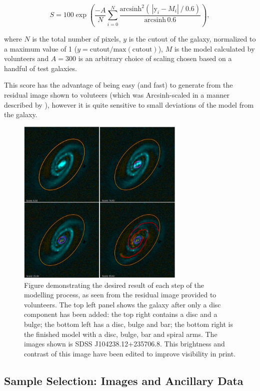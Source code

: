 \documentclass[../main.tex]{subfiles}
\begin{document}
\begin{equation}
  \label{eqn:gal_score}
    S = 100 \exp\left(\frac{-A}{N}\sum_{i=0}^N\frac{\text{arcsinh}^2\left(\,|\text{y}_i - M_i|\ /\ 0.6\right)}{\text{arcsinh}\,0.6 }\right),
\end{equation}

where $N$ is the total number of pixels, $y$ is the cutout of the galaxy, normalized to a maximum value of 1 ($y = \text{cutout}/\text{max}(\text{cutout})$), $M$ is the model calculated by volunteers and $A=300$ is an arbitrary choice of scaling chosen based on a handful of test galaxies.

This score has the advantage of being easy (and fast) to generate from the residual image shown to voluteers (which was Arcsinh-scaled in a manner described by \citealt{Lupton2003:astro-ph/0312483v1}), however it is quite sensitive to small deviations of the model from the galaxy.

\begin{figure}
  \includegraphics[width=8cm]{images/residualProgress.jpg}
  \caption{Figure demonstrating the desired result of each step of the modelling process, as seen from the residual image provided to volunteers. The top left panel shows the galaxy after only a disc component has been added: the top right contains a disc and a bulge; the bottom left has a disc, bulge and bar; the bottom right is the finished model with a disc, bulge, bar and spiral arms. The images shown is SDSS J104238.12+235706.8. This brightness and contrast of this image have been edited to improve visibility in print.}
  \label{fig:residualsStepByStep}
\end{figure}


\subsection{Sample Selection: Images and Ancillary Data}
\label{sec:data}
\end{document}
